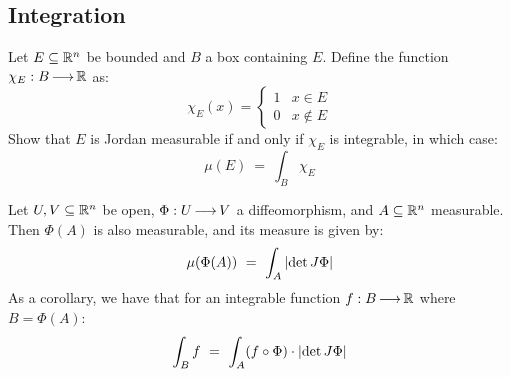 \subsection{Integration}

\begin{thm}[title=Measure as Integral]
    Let $ E \subseteq \mathbb{R}^{n} $ be bounded and $ B $ a box containing $ E $.
    Define the function $ \chi_{E}:B \operatorname{\longrightarrow} \mathbb{R} $ as:
    \begin{equation*}
        \chi_{E}(x) =
        \begin{cases}
            1 & x \in E \\
            0 & x \notin E
        \end{cases}
    \end{equation*}
    Show that $ E $ is Jordan measurable if and only if $ \chi_{E} $ is
    integrable, in which case:
    \begin{equation*}
        \mu(E) \ = \ \int_{B}\chi_{E}
    \end{equation*}
\end{thm}

\begin{thm}[title=Change of Variables]
    Let $ U, V \subseteq \mathbb{R}^{n} $ be open, $ \Phi: U \operatorname{\longrightarrow} V $ a
    diffeomorphism, and $ A \subseteq \mathbb{R}^{n} $ measurable. Then $ \Phi(A) $ is
    also measurable, and its measure is given by:
    \begin{equation*}
        \mu(\Phi(A)) \ = \ \int_{A}\abs{\det J\Phi}
    \end{equation*}
    As a corollary, we have that for an integrable function $ f:B \operatorname{\longrightarrow} \mathbb{R} $
    where $ B = \Phi(A) $:
    \begin{equation*}
        \int_{B}f \ = \ \int_{A}(f \circ \Phi)\cdot\abs{\det J\Phi}
    \end{equation*}
\end{thm}

